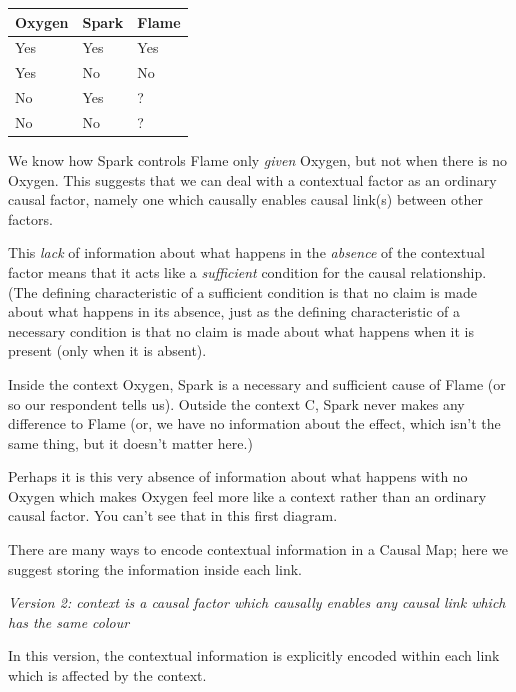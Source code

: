 \documentclass[
]{book}
\begin{document}
\begin{longtable}[]{@{}lll@{}}
\toprule
Oxygen & Spark & Flame \\
\midrule
\endhead
Yes & Yes & Yes \\
Yes & No & No \\
No & Yes & ? \\
No & No & ? \\
\bottomrule
\end{longtable}

We know how Spark controls Flame only \emph{given} Oxygen, but not when there is no Oxygen. This suggests that we can deal with a contextual factor as an ordinary causal factor, namely one which causally enables causal link(s) between other factors.

This \emph{lack} of information about what happens in the \emph{absence} of the contextual factor means that it acts like a \emph{sufficient} condition for the causal relationship. (The defining characteristic of a sufficient condition is that no claim is made about what happens in its absence, just as the defining characteristic of a necessary condition is that no claim is made about what happens when it is present (only when it is absent).

Inside the context Oxygen, Spark is a necessary and sufficient cause of Flame (or so our respondent tells us). Outside the context C, Spark never makes any difference to Flame (or, we have no information about the effect, which isn't the same thing, but it doesn't matter here.)

Perhaps it is this very absence of information about what happens with no Oxygen which makes Oxygen feel more like a context rather than an ordinary causal factor. You can't see that in this first diagram.

There are many ways to encode contextual information in a Causal Map; here we suggest storing the information inside each link.

\emph{Version 2: context is a causal factor which causally enables any causal link which has the same colour}

In this version, the contextual information is explicitly encoded within each link which is affected by the context.
\end{document}
